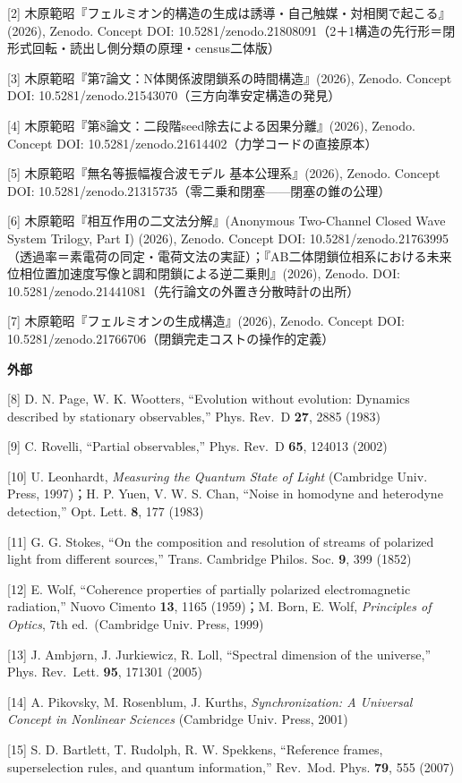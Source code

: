 \documentclass[
  a4paper,
]{ltjsarticle}
\begin{document}
{[}2{]}
木原範昭『フェルミオン的構造の生成は誘導・自己触媒・対相関で起こる』(2026),
Zenodo. Concept DOI:
10.5281/zenodo.21808091（2＋1構造の先行形＝閉形式回転・読出し側分類の原理・census二体版）

{[}3{]} 木原範昭『第7論文：N体関係波閉鎖系の時間構造』(2026), Zenodo.
Concept DOI: 10.5281/zenodo.21543070（三方向準安定構造の発見）

{[}4{]} 木原範昭『第8論文：二段階seed除去による因果分離』(2026), Zenodo.
Concept DOI: 10.5281/zenodo.21614402（力学コードの直接原本）

{[}5{]} 木原範昭『無名等振幅複合波モデル 基本公理系』(2026), Zenodo.
Concept DOI: 10.5281/zenodo.21315735（零二乗和閉塞------閉塞の錐の公理）

{[}6{]} 木原範昭『相互作用の二文法分解』(Anonymous Two-Channel Closed
Wave System Trilogy, Part I) (2026), Zenodo. Concept DOI:
10.5281/zenodo.21763995（透過率＝素電荷の同定・電荷文法の実証）；『AB二体閉鎖位相系における未来位相位置加速度写像と調和閉鎖による逆二乗則』(2026),
Zenodo. DOI: 10.5281/zenodo.21441081（先行論文の外置き分散時計の出所）

{[}7{]} 木原範昭『フェルミオンの生成構造』(2026), Zenodo. Concept DOI:
10.5281/zenodo.21766706（閉鎖完走コストの操作的定義）

\textbf{外部}

{[}8{]} D. N. Page, W. K. Wootters, ``Evolution without evolution:
Dynamics described by stationary observables,'' Phys. Rev.~D
\textbf{27}, 2885 (1983)

{[}9{]} C. Rovelli, ``Partial observables,'' Phys. Rev.~D \textbf{65},
124013 (2002)

{[}10{]} U. Leonhardt, \emph{Measuring the Quantum State of Light}
(Cambridge Univ. Press, 1997)；H. P. Yuen, V. W. S. Chan, ``Noise in
homodyne and heterodyne detection,'' Opt. Lett. \textbf{8}, 177 (1983)

{[}11{]} G. G. Stokes, ``On the composition and resolution of streams of
polarized light from different sources,'' Trans. Cambridge Philos. Soc.
\textbf{9}, 399 (1852)

{[}12{]} E. Wolf, ``Coherence properties of partially polarized
electromagnetic radiation,'' Nuovo Cimento \textbf{13}, 1165 (1959)；M.
Born, E. Wolf, \emph{Principles of Optics}, 7th ed.~(Cambridge Univ.
Press, 1999)

{[}13{]} J. Ambjørn, J. Jurkiewicz, R. Loll, ``Spectral dimension of the
universe,'' Phys. Rev.~Lett. \textbf{95}, 171301 (2005)

{[}14{]} A. Pikovsky, M. Rosenblum, J. Kurths, \emph{Synchronization: A
Universal Concept in Nonlinear Sciences} (Cambridge Univ. Press, 2001)

{[}15{]} S. D. Bartlett, T. Rudolph, R. W. Spekkens, ``Reference frames,
superselection rules, and quantum information,'' Rev.~Mod. Phys.
\textbf{79}, 555 (2007)
\end{document}
